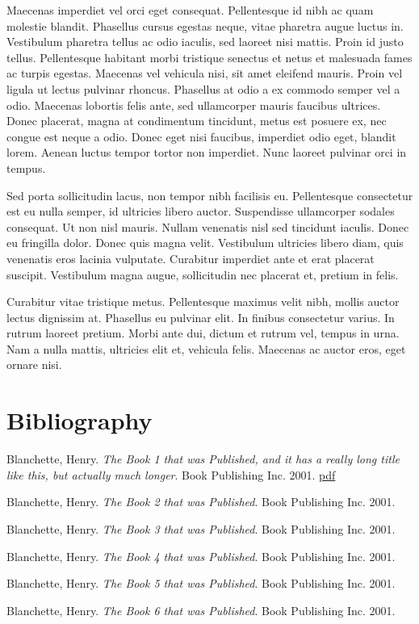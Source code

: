 \documentclass{article}
\begin{document}
 Maecenas imperdiet vel orci eget consequat. Pellentesque id nibh ac quam molestie blandit. Phasellus cursus egestas neque, vitae pharetra augue luctus in. Vestibulum pharetra tellus ac odio iaculis, sed laoreet nisi mattis. Proin id justo tellus. Pellentesque habitant morbi tristique senectus et netus et malesuada fames ac turpis egestas. Maecenas vel vehicula nisi, sit amet eleifend mauris. Proin vel ligula ut lectus pulvinar rhoncus. Phasellus at odio a ex commodo semper vel a odio. Maecenas lobortis felis ante, sed ullamcorper mauris faucibus ultrices. Donec placerat, magna at condimentum tincidunt, metus est posuere ex, nec congue est neque a odio. Donec eget nisi faucibus, imperdiet odio eget, blandit lorem. Aenean luctus tempor tortor non imperdiet. Nunc laoreet pulvinar orci in tempus. 



 Sed porta sollicitudin lacus, non tempor nibh facilisis eu. Pellentesque consectetur est eu nulla semper, id ultricies libero auctor. Suspendisse ullamcorper sodales consequat. Ut non nisl mauris. Nullam venenatis nisl sed tincidunt iaculis. Donec eu fringilla dolor. Donec quis magna velit. Vestibulum ultricies libero diam, quis venenatis eros lacinia vulputate. Curabitur imperdiet ante et erat placerat suscipit. Vestibulum magna augue, sollicitudin nec placerat et, pretium in felis. 



 Curabitur vitae tristique metus. Pellentesque maximus velit nibh, mollis auctor lectus dignissim at. Phasellus eu pulvinar elit. In finibus consectetur varius. In rutrum laoreet pretium. Morbi ante dui, dictum et rutrum vel, tempus in urna. Nam a nulla mattis, ultricies elit et, vehicula felis. Maecenas ac auctor eros, eget ornare nisi. 





\section*{Bibliography}


\noindent  Blanchette, Henry. \textit{The Book 1 that was Published, and it has a really long title like this, but actually much longer}. Book Publishing Inc. 2001. \href{www.google.com}{pdf}



\noindent  Blanchette, Henry. \textit{The Book 2 that was Published}. Book Publishing Inc. 2001. 



\noindent  Blanchette, Henry. \textit{The Book 3 that was Published}. Book Publishing Inc. 2001. 



\noindent  Blanchette, Henry. \textit{The Book 4 that was Published}. Book Publishing Inc. 2001. 



\noindent  Blanchette, Henry. \textit{The Book 5 that was Published}. Book Publishing Inc. 2001. 



\noindent  Blanchette, Henry. \textit{The Book 6 that was Published}. Book Publishing Inc. 2001. 
\end{document}
